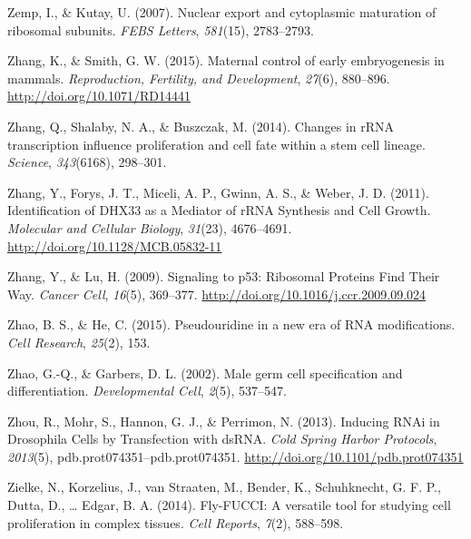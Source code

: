 \documentclass[12pt,twoside]{reedthesis}
\newlength{\cslhangindent}
\newenvironment{cslreferences}%
  {\setlength{\parindent}{0pt}%
  \everypar{\setlength{\hangindent}{\cslhangindent}}\ignorespaces}%
  {\par}
\begin{document}
\begin{cslreferences}
\leavevmode\hypertarget{ref-Zemp2007}{}%
Zemp, I., \& Kutay, U. (2007). Nuclear export and cytoplasmic maturation of ribosomal subunits. \emph{FEBS Letters}, \emph{581}(15), 2783--2793.

\leavevmode\hypertarget{ref-Zhang2015c}{}%
Zhang, K., \& Smith, G. W. (2015). Maternal control of early embryogenesis in mammals. \emph{Reproduction, Fertility, and Development}, \emph{27}(6), 880--896. \url{http://doi.org/10.1071/RD14441}

\leavevmode\hypertarget{ref-Zhang2014d}{}%
Zhang, Q., Shalaby, N. A., \& Buszczak, M. (2014). Changes in rRNA transcription influence proliferation and cell fate within a stem cell lineage. \emph{Science}, \emph{343}(6168), 298--301.

\leavevmode\hypertarget{ref-zhangIdentificationDHX33Mediator2011}{}%
Zhang, Y., Forys, J. T., Miceli, A. P., Gwinn, A. S., \& Weber, J. D. (2011). Identification of DHX33 as a Mediator of rRNA Synthesis and Cell Growth. \emph{Molecular and Cellular Biology}, \emph{31}(23), 4676--4691. \url{http://doi.org/10.1128/MCB.05832-11}

\leavevmode\hypertarget{ref-zhangSignalingP53Ribosomal2009}{}%
Zhang, Y., \& Lu, H. (2009). Signaling to p53: Ribosomal Proteins Find Their Way. \emph{Cancer Cell}, \emph{16}(5), 369--377. \url{http://doi.org/10.1016/j.ccr.2009.09.024}

\leavevmode\hypertarget{ref-Zhao2015}{}%
Zhao, B. S., \& He, C. (2015). Pseudouridine in a new era of RNA modifications. \emph{Cell Research}, \emph{25}(2), 153.

\leavevmode\hypertarget{ref-Zhao2002d}{}%
Zhao, G.-Q., \& Garbers, D. L. (2002). Male germ cell specification and differentiation. \emph{Developmental Cell}, \emph{2}(5), 537--547.

\leavevmode\hypertarget{ref-zhouInducingRNAiDrosophila2013}{}%
Zhou, R., Mohr, S., Hannon, G. J., \& Perrimon, N. (2013). Inducing RNAi in Drosophila Cells by Transfection with dsRNA. \emph{Cold Spring Harbor Protocols}, \emph{2013}(5), pdb.prot074351--pdb.prot074351. \url{http://doi.org/10.1101/pdb.prot074351}

\leavevmode\hypertarget{ref-Zielke2014a}{}%
Zielke, N., Korzelius, J., van Straaten, M., Bender, K., Schuhknecht, G. F. P., Dutta, D., \ldots{} Edgar, B. A. (2014). Fly-FUCCI: A versatile tool for studying cell proliferation in complex tissues. \emph{Cell Reports}, \emph{7}(2), 588--598.
\end{cslreferences}

\end{document}
